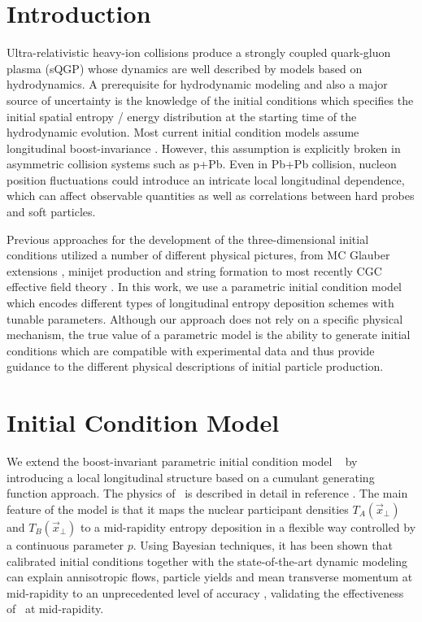 \documentclass[3p,times,twocolumn]{elsarticle}
\begin{document}

\section{Introduction}
\label{Introduction}
Ultra-relativistic heavy-ion collisions produce a strongly coupled quark-gluon plasma (sQGP) whose dynamics are well described by models based on hydrodynamics.
A prerequisite for hydrodynamic modeling and also a major source of uncertainty is the knowledge of the initial conditions which specifies the initial spatial entropy / energy distribution at the starting time of the hydrodynamic evolution.
Most current initial condition models assume longitudinal boost-invariance \cite{Miller:2007ri, Drescher:2006ca, Schenke:2012wb, Niemi:2015qia, Moreland:2014oya}.
However, this assumption is explicitly broken in asymmetric collision systems such as p+Pb.
Even in Pb+Pb collision, nucleon position fluctuations could introduce an intricate local longitudinal dependence, which can affect observable quantities as well as correlations between hard probes and soft particles.

Previous approaches for the development of the three-dimensional initial conditions utilized a number of different physical pictures, from MC Glauber extensions \cite{Bozek:2015bha}, minijet production and string formation \cite{Wang:1991hta} to most recently CGC effective field theory \cite{Schenke:2016ksl}.
In this work, we use a parametric initial condition model which encodes different types of longitudinal entropy deposition schemes with tunable parameters.
Although our approach does not rely on a specific physical mechanism, the true value of a parametric model is the ability to generate initial conditions which are compatible with experimental data and thus provide guidance to the different physical descriptions of initial particle production.

\section{Initial Condition Model}
\label{Model}
We extend the boost-invariant parametric initial condition model \trento~\cite{Moreland:2014oya} by introducing a local longitudinal structure based on a cumulant generating function approach.
The physics of \trento~is described in detail in reference \cite{Moreland:2014oya}. The main feature of the model is that it maps the nuclear participant densities $T_A(\vec{x}_{\perp})$ and $T_B(\vec{x}_{\perp})$ to a mid-rapidity entropy deposition in a flexible way controlled by a continuous parameter $p$.
Using Bayesian techniques, it has been shown that calibrated initial conditions together with the state-of-the-art dynamic modeling can explain annisotropic flows, particle yields and mean transverse momentum at mid-rapidity to an unprecedented level of accuracy \cite{Bernhard:2016tnd}, validating the effectiveness of \trento~at mid-rapidity.
\end{document}
